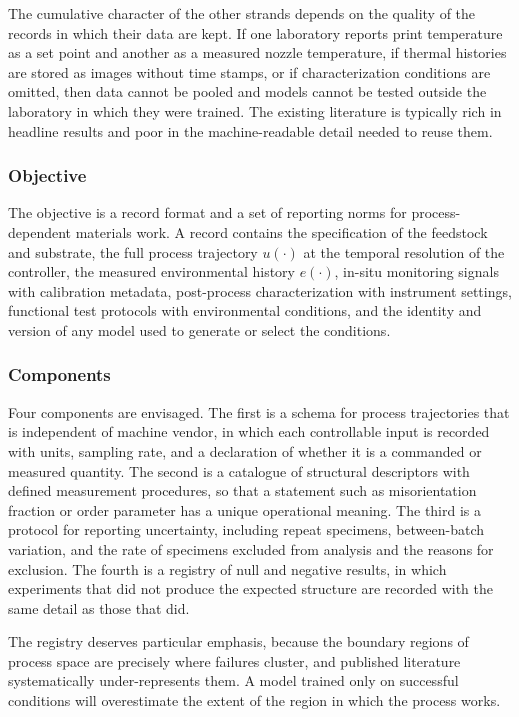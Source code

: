 \documentclass[11pt]{article}
\theoremstyle{definition}
\begin{document}
The cumulative character of the other strands depends on the quality of the records in which their data are kept. If one laboratory reports print temperature as a set point and another as a measured nozzle temperature, if thermal histories are stored as images without time stamps, or if characterization conditions are omitted, then data cannot be pooled and models cannot be tested outside the laboratory in which they were trained. The existing literature is typically rich in headline results and poor in the machine-readable detail needed to reuse them.

\subsubsection*{Objective}

The objective is a record format and a set of reporting norms for process-dependent materials work. A record contains the specification of the feedstock and substrate, the full process trajectory $u(\cdot)$ at the temporal resolution of the controller, the measured environmental history $e(\cdot)$, in-situ monitoring signals with calibration metadata, post-process characterization with instrument settings, functional test protocols with environmental conditions, and the identity and version of any model used to generate or select the conditions.

\subsubsection*{Components}

Four components are envisaged. The first is a schema for process trajectories that is independent of machine vendor, in which each controllable input is recorded with units, sampling rate, and a declaration of whether it is a commanded or measured quantity. The second is a catalogue of structural descriptors with defined measurement procedures, so that a statement such as misorientation fraction or order parameter has a unique operational meaning. The third is a protocol for reporting uncertainty, including repeat specimens, between-batch variation, and the rate of specimens excluded from analysis and the reasons for exclusion. The fourth is a registry of null and negative results, in which experiments that did not produce the expected structure are recorded with the same detail as those that did.

The registry deserves particular emphasis, because the boundary regions of process space are precisely where failures cluster, and published literature systematically under-represents them. A model trained only on successful conditions will overestimate the extent of the region in which the process works.
\end{document}
